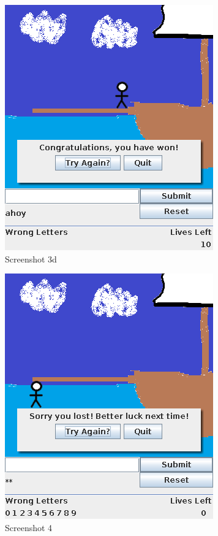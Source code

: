 \documentclass[notitlepage]{report}
\begin{document}
\begin{multicols}{2}
\begin{figure}[H]
\centering
\includegraphics[scale=0.5]{TestScreenshots/3d}
\caption{Screenshot 3d}
\end{figure}

\begin{figure}[H]
\centering
\includegraphics[scale=0.5]{TestScreenshots/4}
\caption{Screenshot 4} 
\end{figure}


\end{multicols}
\end{document}
